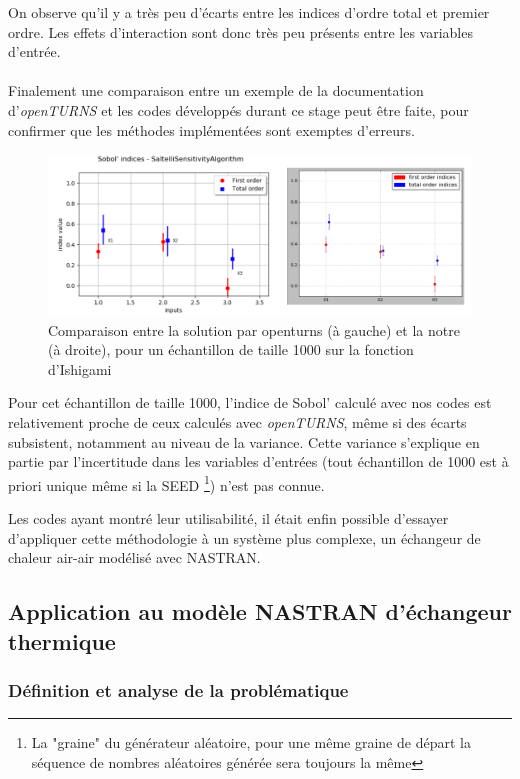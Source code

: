\documentclass[a4paper,10pt]{article}
\begin{document}
On observe qu'il y a très peu d'écarts entre les indices d'ordre total et premier ordre. Les effets d'interaction sont donc très peu présents entre les variables d'entrée.\\
\\
Finalement une comparaison entre un exemple de la documentation d'\textit{openTURNS} et les codes développés durant ce stage peut être faite, pour confirmer que les méthodes implémentées sont exemptes d'erreurs. 

\begin{figure}[H]
   \centering   
   \includegraphics[scale=0.255]{comparisonOtMe.png}
      \caption{Comparaison entre la solution par openturns (à gauche) et la notre (à droite), pour un échantillon de taille 1000 sur la fonction d'Ishigami}
         \label{Comparison}
\end{figure}

Pour cet échantillon de taille 1000, l'indice de Sobol' calculé avec nos codes est relativement proche de ceux calculés avec \textit{openTURNS}, même si des écarts subsistent, notamment au niveau de la variance. Cette variance s'explique en partie par l'incertitude dans les variables d'entrées (tout échantillon de 1000 est à priori unique même si la SEED \footnote{La "graine" du générateur aléatoire, pour une même graine de départ la séquence de nombres aléatoires générée sera toujours la même}) n'est pas connue.

Les codes ayant montré leur utilisabilité, il était enfin possible d'essayer d'appliquer cette méthodologie à un système plus complexe, un échangeur de chaleur air-air modélisé avec NASTRAN. 
 
\subsection{Application au modèle NASTRAN d'échangeur thermique}
\subsubsection{Définition et analyse de la problématique}
\end{document}
